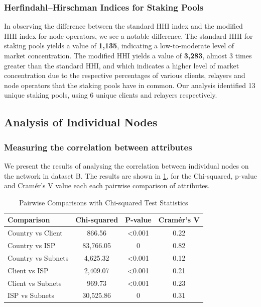 \documentclass[conference]{IEEEtran}
\begin{document}
\subsubsection{Herfindahl–Hirschman Indices for Staking Pools}

In observing the difference between the standard HHI index and the modified HHI index for node operators, we see a notable difference.  The standard HHI for staking pools yields a value of \textbf{1,135}, indicating a low-to-moderate level of market concentration.  The modified HHI yields a value of \textbf{3,283}, almost 3 times greater than the standard HHI, and which indicates a higher level of market concentration due to the respective percentages of various clients, relayers and node operators that the staking pools have in common.  Our analysis identified 13 unique staking pools, using 6 unique clients and relayers respectively.

\subsection{Analysis of Individual Nodes}

\subsubsection{Measuring the correlation between attributes}

We present the results of analysing the correlation between individual nodes on the network in dataset B. The results are shown in \ref{tab:pairwise-comparisons}, for the Chi-squared, p-value and Cramér's V value each each pairwise comparison of attributes.

\begin{table}[h]
    \centering
    \renewcommand{\arraystretch}{1.5}
    \begin{tabular}{|p{2.5cm}|c|c|c|}
        \hline
        \textbf{Comparison} & \textbf{Chi-squared} & \textbf{P-value} & \textbf{Cramér's V} \\
        \hline
        Country vs Client & 866.56 & \textless 0.001 & 0.22 \\ \hline
        Country vs ISP & 83,766.05 & 0 & 0.82 \\ \hline
        Country vs Subnets & 4,625.32 & \textless 0.001 & 0.12 \\ \hline
        Client vs ISP & 2,409.07 & \textless 0.001 & 0.21 \\ \hline
        Client vs Subnets & 969.73 & \textless 0.001 & 0.23 \\ \hline
        ISP vs Subnets & 30,525.86 & 0 & 0.31 \\ \hline
    \end{tabular}
    \vspace{10pt}
    \caption{Pairwise Comparisons with Chi-squared Test Statistics}
    \label{tab:pairwise-comparisons}
\end{table}
\end{document}
